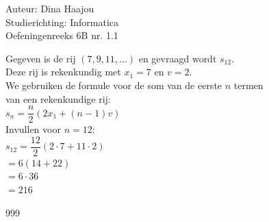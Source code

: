 \documentclass[a4paper]{article}
\begin{document}
\normalsize

\noindent \large Auteur: Dina Haajou \\
\noindent \large Studierichting: Informatica \\
\noindent \large Oefeningenreeks 6B nr. 1.1 \\

\medskip

\normalsize

Gegeven is de rij $(7, 9, 11, \ldots)$ en gevraagd wordt $s_{12}$. \\

Deze rij is rekenkundig met $x_1 = 7$ en $v = 2$. \\

We gebruiken de formule voor de som van de eerste $n$ termen \\

van een rekenkundige rij: \\

$s_n = \dfrac{n}{2}(2x_1 + (n-1)v)$ \\

Invullen voor $n = 12$: \\

$s_{12} = \dfrac{12}{2}(2 \cdot 7 + 11 \cdot 2)$ \\

$= 6(14 + 22)$ \\

$= 6 \cdot 36$ \\

$= 216$ \\

\begin{thebibliography}{999}
\end{thebibliography}
\end{document}
